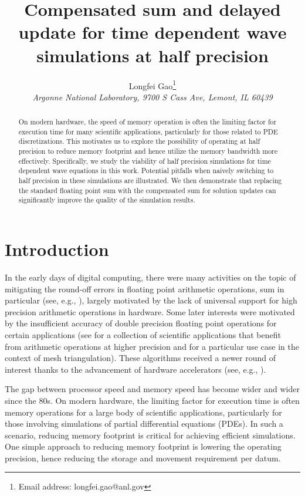\documentclass[10pt]{article}
\title{\large Compensated sum and delayed update for time dependent wave simulations at half precision}
\author{\small Longfei Gao\thanks{Email address: longfei.gao@anl.gov}
\\ {\it \small Argonne National Laboratory, 9700 S Cass Ave, Lemont, IL 60439} 
}
\date{}
\begin{document}

\maketitle


\begin{abstract}
On modern hardware, the speed of memory operation is often the limiting factor for execution time for many scientific applications, particularly for those related to PDE discretizations. %
%
This motivates us to explore the possibility of operating at half precision to reduce memory footprint and hence utilize the memory bandwidth more effectively.
%
Specifically, we study the viability of half precision simulations for time dependent wave equations in this work. 
%
Potential pitfalls when naively switching to half precision in these simulations are illustrated.
%
We then demonstrate that replacing the standard floating point sum with the compensated sum for solution updates can significantly improve the quality of the simulation results.
%
\end{abstract}
 

\section{Introduction}\label{sec_introduction}
%
In the early days of digital computing, 
there were many activities on the topic of mitigating the round-off errors in floating point arithmetic operations, 
sum in particular (see, e.g., \cite{kahan1965pracniques,moller1965quasi,moller1965note,linz1970accurate,dekker1971floating,neumaier1974rundungsfehleranalyse}), 
largely motivated by the lack of universal support for high precision arithmetic operations in hardware. 
%
Some later interests were motivated by the insufficient accuracy of double precision floating point operations for certain applications (see \cite{bailey2012high} for a collection of scientific applications that benefit from arithmetic operations at higher precision and \cite{shewchuk1997adaptive} for a particular use case in the context of mesh triangulation). 
%
These algorithms received a newer round of interest thanks to the advancement of 
hardware accelerators (see, e.g., \cite{thall2006extended, goddeke2007performance}).


The gap between processor speed and memory speed has become wider and wider since the 80s. 
%
On modern hardware, the limiting factor for execution time is often memory operations for a large body of scientific applications, particularly for those involving simulations of partial differential equations (PDEs).
%
In such a scenario, reducing memory footprint is critical for achieving efficient simulations.
%
One simple approach to reducing memory footprint is lowering the operating precision, hence reducing the storage and movement requirement per datum.
\end{document}
